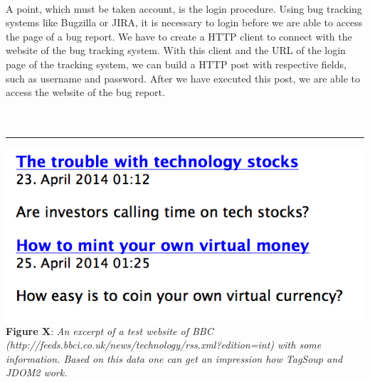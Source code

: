  \\ A point, which must be taken account, is the login procedure. Using bug tracking systems like Bugzilla or JIRA, it is necessary to login before we are able to access the page of a bug report. We have to create a HTTP client to connect with the website of the bug tracking system. With this client and the URL of the login page of the tracking system, we can build a HTTP post with respective fields, such as username and password. After we have executed this post, we are able to access the website of the bug report. \\ \\ \\ \hrule\includegraphics[width=1.0\textwidth]{website_ausschnitt.png} \\\textbf{Figure X}: \textit{An excerpt of a test website of BBC \\ (http://feeds.bbci.co.uk/news/technology/rss.xml?edition=int) with some information. Based on this data one can get an impression how TagSoup and JDOM2 work.}  \\ 